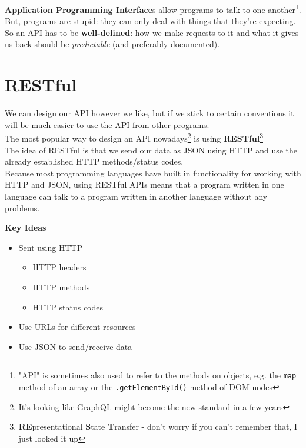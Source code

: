 \textbf{Application Programming Interface}s allow programs to talk to one another\footnote{"API" is sometimes also used to refer to the methods on objects, e.g. the \texttt{map} method of an array or the \texttt{.getElementById()} method of DOM nodes}.
\\

But, programs are stupid: they can only deal with things that they're expecting.
\\

So an API has to be \textbf{well-defined}: how we make requests to it and what it gives us back should be \textit{predictable} (and preferably documented).


\section{RESTful}

We can design our API however we like, but if we stick to certain conventions it will be much easier to use the API from other programs.
\\

The most popular way to design an API nowadays\footnote{It's looking like GraphQL might become the new standard in a few years} is using \textbf{RESTful}\footnote{\textbf{RE}presentational \textbf{S}tate \textbf{T}ransfer - don't worry if you can't remember that, I just looked it up}
\\

The idea of RESTful is that we send our data as JSON using HTTP and use the already established HTTP methods/status codes.
\\

Because most programming languages have built in functionality for working with HTTP and JSON, using RESTful APIs means that a program written in one language can talk to a program written in another language without any problems.


\pagebreak


\textbf{Key Ideas}

\begin{itemize}
    \item Sent using HTTP
        \begin{itemize}
            \item HTTP headers
            \item HTTP methods
            \item HTTP status codes
        \end{itemize}
    \item Use URLs for different resources
    \item Use JSON to send/receive data
\end{itemize}


